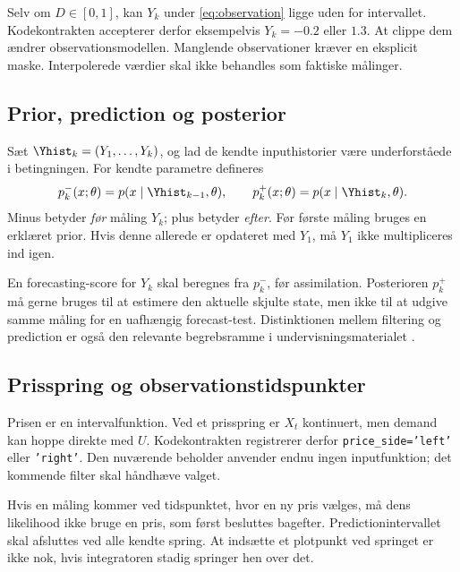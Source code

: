 Selv om \(D\in[0,1]\), kan \(Y_k\) under \eqref{eq:observation} ligge uden for intervallet. Kodekontrakten accepterer derfor eksempelvis \(Y_k=-0.2\) eller \(1.3\). At clippe dem ændrer observationsmodellen. Manglende observationer kræver en eksplicit maske. Interpolerede værdier skal ikke behandles som faktiske målinger.

\subsection{Prior, prediction og posterior}
Sæt \(\Yhist_k=(Y_1,\ldots,Y_k)\), og lad de kendte inputhistorier være underforståede i betingningen. For kendte parametre defineres
\begin{equation}
 p_k^-(x;\theta)=p(x\mid\Yhist_{k-1},\theta),\qquad
 p_k^+(x;\theta)=p(x\mid\Yhist_k,\theta).
 \label{eq:priorposterior}
\end{equation}
Minus betyder \emph{før} måling \(Y_k\); plus betyder \emph{efter}. Før første måling bruges en erklæret prior. Hvis denne allerede er opdateret med \(Y_1\), må \(Y_1\) ikke multipliceres ind igen.

En forecasting-score for \(Y_k\) skal beregnes fra \(p_k^-\), før assimilation. Posterioren \(p_k^+\) må gerne bruges til at estimere den aktuelle skjulte state, men ikke til at udgive samme måling for en uafhængig forecast-test. Distinktionen mellem filtering og prediction er også den relevante begrebsramme i undervisningsmaterialet \cite{lecture}.

\subsection{Prisspring og observationstidspunkter}
Prisen er en intervalfunktion. Ved et prisspring er \(X_t\) kontinuert, men demand kan hoppe direkte med \(U\). Kodekontrakten registrerer derfor \texttt{price\_side='left'} eller \texttt{'right'}. Den nuværende beholder anvender endnu ingen inputfunktion; det kommende filter skal håndhæve valget.

Hvis en måling kommer ved tidspunktet, hvor en ny pris vælges, må dens likelihood ikke bruge en pris, som først besluttes bagefter. Predictionintervallet skal afsluttes ved alle kendte spring. At indsætte et plotpunkt ved springet er ikke nok, hvis integratoren stadig springer hen over det.

